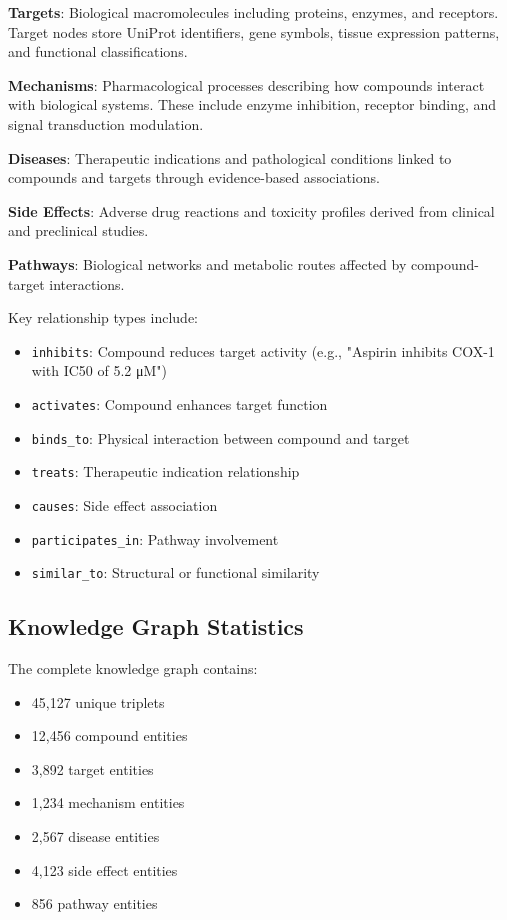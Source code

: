 \documentclass[conference]{IEEEtran}
\begin{document}
\textbf{Targets}: Biological macromolecules including proteins, enzymes, and receptors. Target nodes store UniProt identifiers, gene symbols, tissue expression patterns, and functional classifications.

\textbf{Mechanisms}: Pharmacological processes describing how compounds interact with biological systems. These include enzyme inhibition, receptor binding, and signal transduction modulation.

\textbf{Diseases}: Therapeutic indications and pathological conditions linked to compounds and targets through evidence-based associations.

\textbf{Side Effects}: Adverse drug reactions and toxicity profiles derived from clinical and preclinical studies.

\textbf{Pathways}: Biological networks and metabolic routes affected by compound-target interactions.

Key relationship types include:
\begin{itemize}
\item \texttt{inhibits}: Compound reduces target activity (e.g., "Aspirin inhibits COX-1 with IC50 of 5.2 μM")
\item \texttt{activates}: Compound enhances target function
\item \texttt{binds\_to}: Physical interaction between compound and target
\item \texttt{treats}: Therapeutic indication relationship
\item \texttt{causes}: Side effect association
\item \texttt{participates\_in}: Pathway involvement
\item \texttt{similar\_to}: Structural or functional similarity
\end{itemize}

\subsection{Knowledge Graph Statistics}

The complete knowledge graph contains:
\begin{itemize}
\item 45,127 unique triplets
\item 12,456 compound entities
\item 3,892 target entities  
\item 1,234 mechanism entities
\item 2,567 disease entities
\item 4,123 side effect entities
\item 856 pathway entities
\end{itemize}
\end{document}
